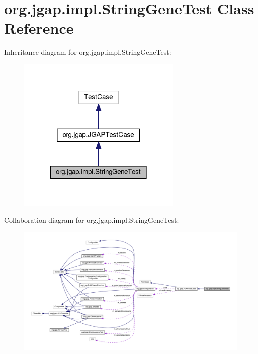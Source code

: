 \hypertarget{classorg_1_1jgap_1_1impl_1_1_string_gene_test}{\section{org.\-jgap.\-impl.\-String\-Gene\-Test Class Reference}
\label{classorg_1_1jgap_1_1impl_1_1_string_gene_test}
}


Inheritance diagram for org.\-jgap.\-impl.\-String\-Gene\-Test\-:
\nopagebreak
\begin{figure}[H]
\begin{center}
\leavevmode
\includegraphics[width=222pt]{classorg_1_1jgap_1_1impl_1_1_string_gene_test__inherit__graph}
\end{center}
\end{figure}


Collaboration diagram for org.\-jgap.\-impl.\-String\-Gene\-Test\-:
\nopagebreak
\begin{figure}[H]
\begin{center}
\leavevmode
\includegraphics[width=350pt]{classorg_1_1jgap_1_1impl_1_1_string_gene_test__coll__graph}
\end{center}
\end{figure}
